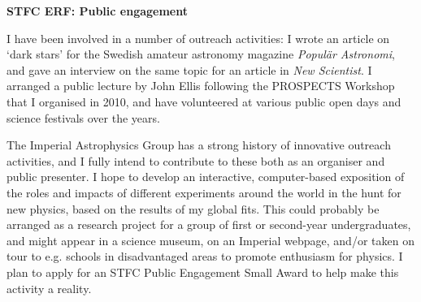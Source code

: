 \documentclass[11pt,a4paper]{article}
\author{Pat Scott}
\begin{document}
\thispagestyle{fancy}

\centerline{\textbf{STFC ERF: Public engagement}}\bigskip 

I have been involved in a number of outreach activities: I wrote an article on `dark stars' for the Swedish amateur astronomy magazine \textit{Popul\"ar Astronomi}, and gave an interview on the same topic for an article in \textit{New Scientist}.  I arranged a public lecture by John Ellis following the PROSPECTS Workshop that I organised in 2010, and have volunteered at various public open days and science festivals over the years. 

The Imperial Astrophysics Group has a strong history of innovative outreach activities, and I fully intend to contribute to these both as an organiser and public presenter.  I hope to develop an interactive, computer-based exposition of the roles and impacts of different experiments around the world in the hunt for new physics, based on the results of my global fits.  This could probably be arranged as a research project for a group of first or second-year undergraduates, and might appear in a science museum, on an Imperial webpage, and/or taken on tour to e.g. schools in disadvantaged areas to promote enthusiasm for physics.  I plan to apply for an STFC Public Engagement Small Award to help make this activity a reality.
\end{document}
